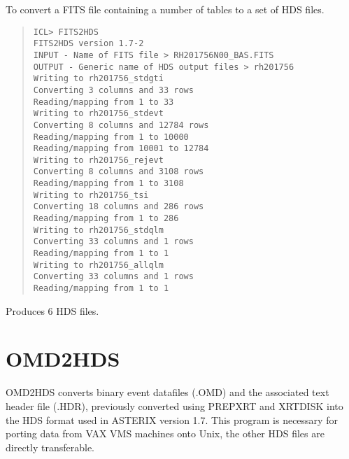 \documentclass{book}
\renewcommand{\_}{{\tt\char'137}}     %
\begin{document}
To convert a FITS file containing a number of tables to a set of HDS
files.
\begin{quote}\begin{verbatim}
ICL> FITS2HDS
FITS2HDS version 1.7-2
INPUT - Name of FITS file > RH201756N00_BAS.FITS
OUTPUT - Generic name of HDS output files > rh201756
Writing to rh201756_stdgti
Converting 3 columns and 33 rows
Reading/mapping from 1 to 33
Writing to rh201756_stdevt
Converting 8 columns and 12784 rows
Reading/mapping from 1 to 10000
Reading/mapping from 10001 to 12784
Writing to rh201756_rejevt
Converting 8 columns and 3108 rows
Reading/mapping from 1 to 3108
Writing to rh201756_tsi
Converting 18 columns and 286 rows
Reading/mapping from 1 to 286
Writing to rh201756_stdqlm
Converting 33 columns and 1 rows
Reading/mapping from 1 to 1
Writing to rh201756_allqlm
Converting 33 columns and 1 rows
Reading/mapping from 1 to 1
\end{verbatim}\end{quote}
Produces 6 HDS files.
\section{OMD2HDS}
OMD2HDS converts binary event datafiles (.OMD) and the associated text
header file (.HDR), previously converted using PREPXRT and XRTDISK into
the HDS format used in ASTERIX version 1.7. This program is necessary
for porting data from VAX VMS machines onto Unix, the other HDS files
are directly transferable.
 
\end{document}
